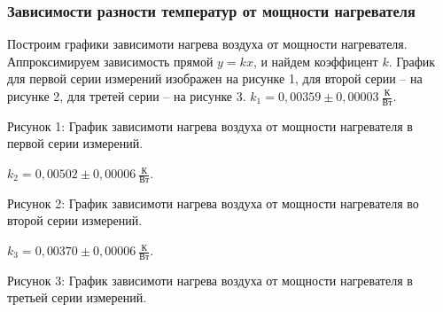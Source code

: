 \documentclass[a4paper,11pt]{article}
\begin{document}
\subsubsection{Зависимости разности температур от мощности нагревателя}
Построим графики зависимоти нагрева воздуха от мощности нагревателя. Аппроксимируем зависимость прямой $y=kx$, и найдем коэффицент $k$.\newline
График для первой серии измерений изображен на рисунке 1, для второй серии -- на рисунке 2, для третей серии -- на рисунке 3.\newline\newline
$k_{1} = 0,00359 \pm 0,00003\ \frac{К}{Вт}$.\newline
%
\begin{center}
\newline
Рисунок 1: График зависимоти нагрева воздуха от мощности нагревателя в первой серии измерений.\newline
\end{center}
$k_{2} = 0,00502 \pm 0,00006\ \frac{К}{Вт}$.\newline
%
\begin{center}
\newline
Рисунок 2: График зависимоти нагрева воздуха от мощности нагревателя во второй серии измерений.\newline
\end{center}
$k_{3} = 0,00370 \pm 0,00006\ \frac{К}{Вт}$.\newline
%
\begin{center}
\newline
Рисунок 3: График зависимоти нагрева воздуха от мощности нагревателя в третьей серии измерений.\newline
\end{center}
\end{document}
